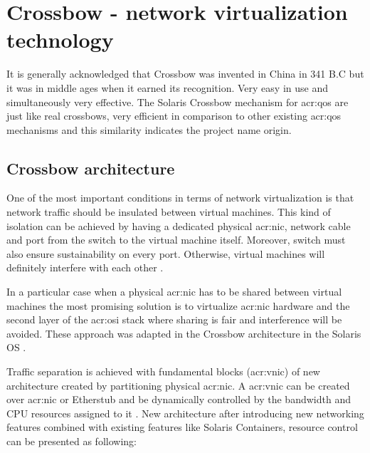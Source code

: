 \documentclass[11pt,openany]{book}
\begin{document}
    \section{Crossbow - network virtualization technology}
    \label{sec:sol:xbow}


      It is generally acknowledged that Crossbow was invented in China in 341 B.C but it was in middle ages when it
      earned its recognition. Very easy in use and simultaneously very effective. The Solaris Crossbow mechanism for
      \gls{acr:qos} are just like real crossbows, very efficient in comparison to other existing \gls{acr:qos}
      mechanisms and this similarity indicates the project name origin.


      \subsection{Crossbow architecture}

        One of the most important conditions in terms of network virtualization is that network traffic should be
        insulated between virtual machines. This kind of isolation can be achieved by having a dedicated physical
        \gls{acr:nic}, network cable and port from the switch to the virtual machine itself. Moreover, switch must also
        ensure sustainability on every port. Otherwise, virtual machines will definitely interfere with each other
        \cite{crossbow}.
        
        In a particular case when a physical \gls{acr:nic} has to be shared between virtual machines the most promising
        solution is to virtualize \gls{acr:nic} hardware and the second layer of the \gls{acr:osi} stack where sharing
        is fair and interference will be avoided. These approach was adapted in the Crossbow architecture in the Solaris
        OS \cite{crossbow}.
        
        Traffic separation is achieved with fundamental blocks (\gls{acr:vnic}) of new architecture created by
        partitioning physical \gls{acr:nic}. A \gls{acr:vnic} can be created over \gls{acr:nic} or Etherstub and be
        dynamically controlled by the bandwidth and CPU resources assigned to it \cite{crossbow,network_virtualization}.
        New architecture after introducing new networking features combined with existing features like Solaris
        Containers, resource control can be presented as following:
\end{document}
